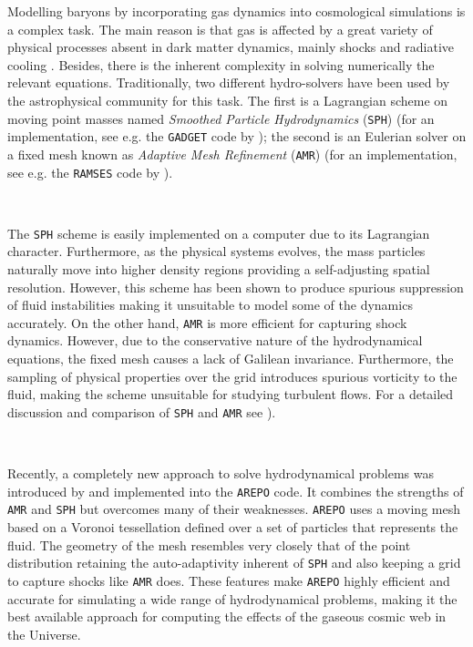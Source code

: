 \documentclass[a4,useAMS,usenatbib,usegraphicx,12pt]{article}
\begin{document}
Modelling baryons by incorporating gas dynamics into cosmological
simulations is a complex task. The main reason is that gas is
affected by a great variety of physical processes absent in dark
matter dynamics, mainly shocks and radiative cooling
\citep{Bond93}. Besides, there is the inherent complexity in
solving numerically the relevant equations. Traditionally, two
different hydro-solvers have been used by the astrophysical community
for this task. The first is a Lagrangian scheme on moving point masses
named \textit{Smoothed Particle Hydrodynamics} (\texttt{SPH}) 
\citep{Monaghan92} (for an implementation, see e.g. the \texttt{GADGET} 
code by \citet{Springel05}); the second is an Eulerian solver on a fixed 
mesh known as \textit{ Adaptive Mesh Refinement} (\texttt{AMR})
\citep{Berger89} (for an implementation,  see e.g. the \texttt{RAMSES}
code by \citet{Teyssier02}).  

\

The \texttt{SPH} scheme is easily implemented on a computer due to its 
Lagrangian character. Furthermore, as the physical systems evolves, the
mass particles naturally move into higher density regions providing a
self-adjusting spatial resolution. However, this scheme has been shown
to produce spurious suppression of fluid instabilities making it
unsuitable to model some of the dynamics accurately. 
On the other hand, \texttt{AMR} is more efficient 
for capturing shock dynamics. However, due to the conservative nature of the
hydrodynamical equations, the fixed mesh causes a lack of Galilean
invariance. Furthermore, the sampling of physical properties over the
grid introduces spurious vorticity to the fluid, making the scheme
unsuitable for studying turbulent flows. For a detailed  discussion
and comparison of \texttt{SPH} and \texttt{AMR} see \citet{Plewa01}).

\

Recently, a completely new approach to solve hydrodynamical problems was 
introduced by \citet{Springel10} and  implemented into the \texttt{AREPO}
code. It combines the strengths of  \texttt{AMR} and \texttt{SPH} but
overcomes many of their weaknesses. \texttt{AREPO} uses a moving mesh based
on a Voronoi tessellation defined over a set of particles that represents 
the fluid. The geometry of the mesh resembles very closely that 
of the point distribution retaining the auto-adaptivity inherent of
\texttt{SPH} and also keeping a grid to capture shocks like
\texttt{AMR} does. These features make \texttt{AREPO} highly 
efficient and accurate for simulating a wide range of hydrodynamical
problems, making it the best available approach for computing the
effects of the gaseous cosmic web in the Universe.
\end{document}
